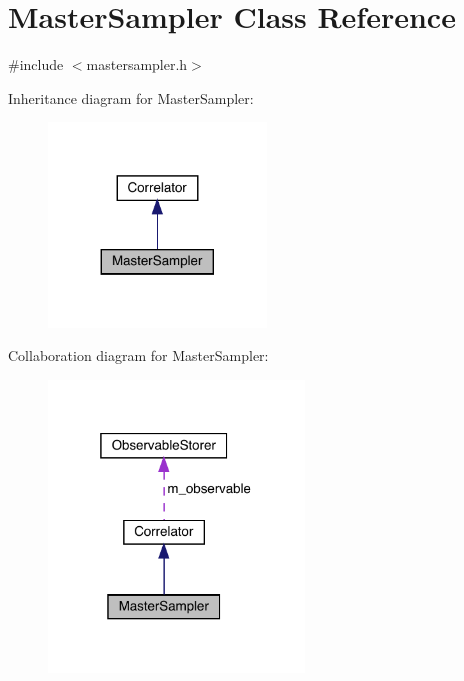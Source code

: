 \hypertarget{class_master_sampler}{}\section{Master\+Sampler Class Reference}
\label{class_master_sampler}


{\ttfamily \#include $<$mastersampler.\+h$>$}



Inheritance diagram for Master\+Sampler\+:\nopagebreak
\begin{figure}[H]
\begin{center}
\leavevmode
\includegraphics[width=164pt]{class_master_sampler__inherit__graph}
\end{center}
\end{figure}


Collaboration diagram for Master\+Sampler\+:\nopagebreak
\begin{figure}[H]
\begin{center}
\leavevmode
\includegraphics[width=193pt]{class_master_sampler__coll__graph}
\end{center}
\end{figure}
